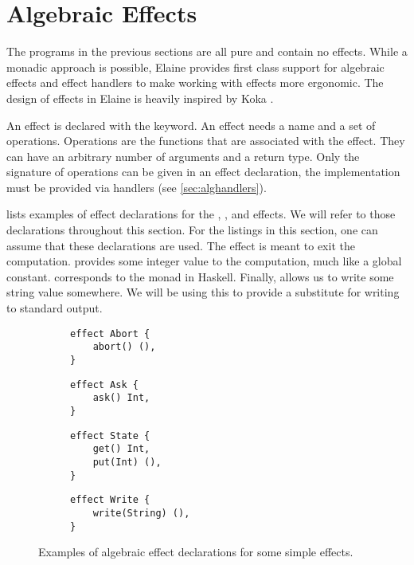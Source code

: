 \section{Algebraic Effects}

The programs in the previous sections are all pure and contain no effects. While a monadic approach is possible, Elaine provides first class support for algebraic effects and effect handlers to make working with effects more ergonomic. The design of effects in Elaine is heavily inspired by Koka \autocite{leijen_koka_2014}.

An effect is declared with the  keyword. An effect needs a name and a set of operations. Operations are the functions that are associated with the effect. They can have an arbitrary number of arguments and a return type. Only the signature of operations can be given in an effect declaration, the implementation must be provided via handlers (see \cref{sec:alghandlers}).

 lists examples of effect declarations for the , ,  and  effects. We will refer to those declarations throughout this section. For the listings in this section, one can assume that these declarations are used. The  effect is meant to exit the computation.  provides some integer value to the computation, much like a global constant.  corresponds to the  monad in Haskell. Finally,  allows us to write some string value somewhere. We will be using this to provide a substitute for writing to standard output.

\begin{figure}[htbp]
    \begin{subfigure}{0.5\textwidth}
        \begin{lstlisting}[style=fancy]
effect Abort {
    abort() (),
}
        \end{lstlisting}
    \end{subfigure}
    \begin{subfigure}{0.5\textwidth}
        \begin{lstlisting}[style=fancy]
effect Ask {
    ask() Int,
}
        \end{lstlisting}
    \end{subfigure}
    \begin{subfigure}{0.5\textwidth}
        \begin{lstlisting}[style=fancy]
effect State {
    get() Int,
    put(Int) (),
}
        \end{lstlisting}
    \end{subfigure}
    \begin{subfigure}{0.5\textwidth}
        \begin{lstlisting}[style=fancy]
effect Write {
    write(String) (),
}

        \end{lstlisting}
    \end{subfigure}
    \caption{Examples of algebraic effect declarations for some simple effects.}
    \label{fig:effect_decls}
\end{figure}


